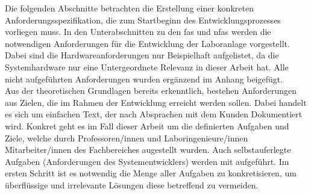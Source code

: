 \documentclass[../../../Bachelorarbeit.tex]{subfiles}
\begin{document}
Die folgenden Abschnitte betrachten die Erstellung einer konkreten Anforderungsspezifikation, die zum Startbeginn des Entwicklungsprozesses vorliegen muss. In den Unterabschnitten zu den \acp{fa} und \acp{nfa} werden die notwendigen Anforderungen für die Entwicklung der Laboranlage vorgestellt. Dabei sind die Hardwareanforderungen nur Beispielhaft aufgelistet, da die Systemhardware nur eine Untergeordnete Relevanz in dieser Arbeit hat. Alle nicht aufgeführten Anforderungen wurden ergänzend im Anhang beigefügt. \\
Aus der theoretischen Grundlagen bereits erkenntlich, bestehen Anforderungen aus Zielen, die im Rahmen der Entwicklung erreicht werden sollen. Dabei handelt es sich um einfachen Text, der nach Absprachen mit dem Kunden Dokumentiert wird. Konkret geht es im Fall dieser Arbeit um die definierten Aufgaben und Ziele, welche durch Professoren/innen und Laboringenieure/innen \bzw Mitarbeiter/innen des Fachbereiches augestellt wurden. Auch selbstauferlegte Aufgaben (Anforderungen des Systementwicklers) werden mit aufgeführt. Im ersten Schritt ist es notwendig die Menge aller Aufgaben zu konkretisieren, um überflüssige und irrelevante Lösungen diese betreffend zu vermeiden.\\
\end{document}
